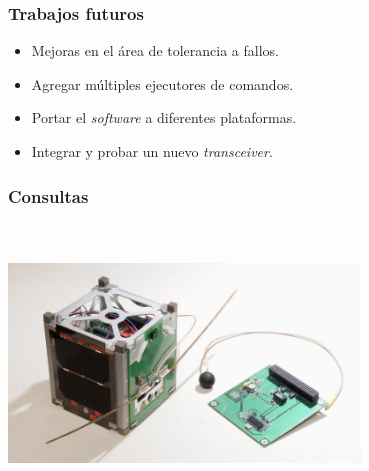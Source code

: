 \documentclass[xcolor=dvipsnames]{beamer}
\begin{document}
    \begin{frame}
        \frametitle{Trabajos futuros}
        \begin{itemize}
            \item Mejoras en el área de tolerancia a fallos.
            \item Agregar múltiples ejecutores de comandos.
            \item Portar el \textit{software} a diferentes plataformas.
            \item Integrar y probar un nuevo \textit{transceiver}.
        \end{itemize}

    \end{frame}
    
    \begin{frame}
        \frametitle{Consultas}
        \centering
        \Large {}\\
        
        \normalsize {}\\
        
        \vspace{1cm}
        \includegraphics[width=0.7\textwidth]{img/suchai_satellite.jpg}
    \end{frame}
    
    \begin{frame}
        \centering \Large {}
        
    \end{frame}
    
\end{document}
